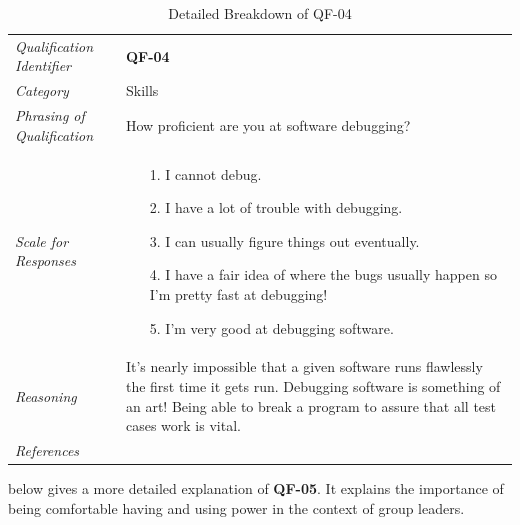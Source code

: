 \documentclass[12pt,letterpaper]{article}
\begin{document}
\begin{table}[H]
	\caption{Detailed Breakdown of QF-04}
	\begin{tabu} to 
		\toprule
		Qualification Identifier & {\bf QF-04}\\
		Category & Skills \\
		Phrasing of Qualification & How proficient are you at software debugging? \\
		Scale for Responses &
		\begin{minipage}[t]{\linewidth}
			\begin{enumerate}
				\item[1.] I cannot debug.
				\item[2.] I have a lot of trouble with debugging.
				\item[3.] I can usually figure things out eventually.
				\item[4.] I have a fair idea of where the bugs usually happen so I'm pretty fast at debugging!
				\item[5.] I'm very good at debugging software.
			\end{enumerate}
		\end{minipage}\\
		Reasoning & It's nearly impossible that a given software runs flawlessly the first time it gets run. Debugging software is something of an art! Being able to break a program to assure that all test cases work is vital.\\
		References & \\
		\toprule
	\end{tabu}
\end{table}

\newpage{}

 below gives a more detailed explanation of {\bf QF-05}. It explains the importance of being comfortable having and using power in the context of group leaders.
\end{document}
